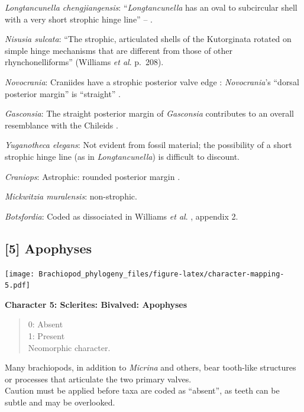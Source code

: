 \documentclass[openany]{book}
\theoremstyle{definition}
\theoremstyle{definition}
\theoremstyle{definition}
\theoremstyle{remark}
\begin{document}
\emph{Longtancunella chengjiangensis}: ``\emph{Longtancunella} has an
oval to subcircular shell with a very short strophic hinge line'' --
\citet{Zhang2011Theexceptionally}.

\emph{Nisusia sulcata}: ``The strophic, articulated shells of the
Kutorginata rotated on simple hinge mechanisms that are different from
those of other rhynchonelliforms'' (Williams \emph{et al}. p.~208).

\emph{Novocrania}: Craniides have a strophic posterior valve edge
\citep[table 39 on p.~2853]{Williams2007PartH}: \emph{Novocrania}'s
``dorsal posterior margin'' is ``straight''
\citep[p.~171]{Williams2000BrachiopodaLinguliformea}.

\emph{Gasconsia}: The straight posterior margin of \emph{Gasconsia}
contributes to an overall resemblance with the Chileids
\citep{Holmer2014OrdovicianSilurian}.

\emph{Yuganotheca elegans}: Not evident from fossil material; the
possibility of a short strophic hinge line (as in \emph{Longtancunella})
is difficult to discount.

\emph{Craniops}: Astrophic: rounded posterior margin \citep[see fig. 91
in][]{Williams2000BrachiopodaLinguliformea}.

\emph{Mickwitzia muralensis}: non-strophic.

\emph{Botsfordia}: Coded as dissociated in Williams \emph{et al}.
\citeyearpar{Williams1998Thediversity}, appendix 2.

\hypertarget{apophyses}{%
\subsection*{{[}5{]} Apophyses}\label{apophyses}}

\texttt{[image: Brachiopod\_phylogeny\_files/figure-latex/character-mapping-5.pdf]}

\textbf{Character 5: Sclerites: Bivalved: Apophyses}

\begin{quote}
0: Absent\\
1: Present\\
Neomorphic character.
\end{quote}

Many brachiopods, in addition to \emph{Micrina} and others, bear
tooth-like structures or processes that articulate the two primary
valves.\\
Caution must be applied before taxa are coded as ``absent'', as teeth
can be subtle and may be overlooked.
\end{document}

